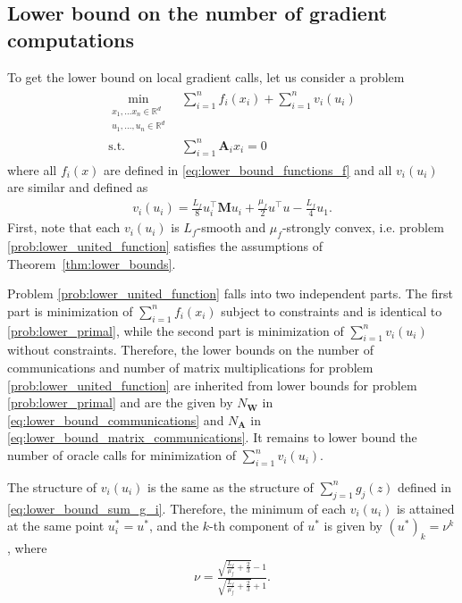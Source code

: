 \documentclass{article}
\newcommand{\R}{\mathbb{R}}
\newcommand{\mA}{\mathbf{A}}
\newcommand{\mW}{\mathbf{W}}
\newcommand{\mM}{\mathbf{M}}
\begin{document}
\subsection{Lower bound on the number of gradient computations}

To get the lower bound on local gradient calls, let us consider a problem
\begin{align}\label{prob:lower_united_function}
\begin{aligned}
	\min_{\substack{x_1, \ldots x_n\in \R^d \\ u_1, \ldots, u_n \in \R^d}}~ &\sum_{i=1}^n f_i(x_i) + \sum_{i=1}^n v_i(u_i) \\
	\text{s.t. }~ &\sum_{i=1}^n \mA_i x_i = 0
\end{aligned}
\end{align}
where all $f_i(x)$ are defined in \eqref{eq:lower_bound_functions_f} and all $v_i(u_i)$ are similar and defined as
\begin{align*}
	v_i(u_i) = \frac{L_f}{8} u_i^\top \mM u_i + \frac{\mu_f}{2} u^\top u - \frac{L_f}{4} u_1.
\end{align*}
First, note that each $v_i(u_i)$ is $L_f$-smooth and $\mu_f$-strongly convex, i.e. problem \eqref{prob:lower_united_function} satisfies the assumptions of Theorem~\ref{thm:lower_bounds}.

Problem \eqref{prob:lower_united_function} falls into two independent parts. The first part is minimization of $\sum_{i=1}^n f_i(x_i)$ subject to constraints and is identical to \eqref{prob:lower_primal}, while the second part is minimization of $\sum_{i=1}^n v_i(u_i)$ without constraints. Therefore, the lower bounds on the number of communications and number of matrix multiplications for problem \eqref{prob:lower_united_function} are inherited from lower bounds for problem \eqref{prob:lower_primal} and are the given by $N_\mW$ in \eqref{eq:lower_bound_communications} and $N_\mA$ in \eqref{eq:lower_bound_matrix_communications}. It remains to lower bound the number of oracle calls for minimization of $\sum_{i=1}^n v_i(u_i)$.

The structure of $v_i(u_i)$ is the same as the structure of $\sum_{j=1}^n g_j(z)$ defined in \eqref{eq:lower_bound_sum_g_i}. Therefore, the minimum of each $v_i(u_i)$ is attained at the same point $u_i^* = u^*$, and the $k$-th component of $u^*$ is given by $(u^*)_k = \nu^k$, where 
\begin{align*}
	\nu = \frac{\sqrt{\frac{L_f}{\mu_f} + \frac23} - 1}{\sqrt{\frac{L_f}{\mu_f} + \frac23} + 1}.
\end{align*}
\end{document}
